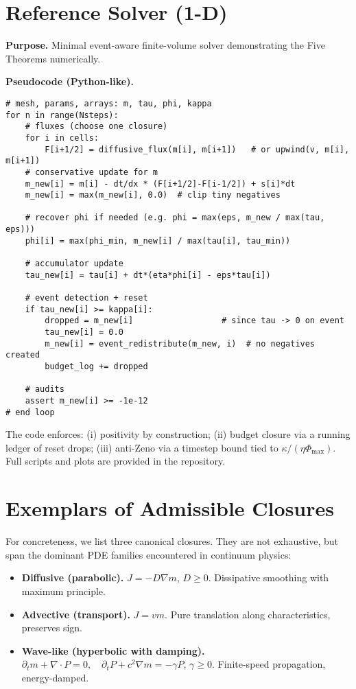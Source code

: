 \documentclass[11pt]{article}
\begin{document}
\appendix
\section{Reference Solver (1-D) }\label{app:solver}

\noindent\textbf{Purpose.}
Minimal event-aware finite-volume solver demonstrating the Five Theorems numerically.

\medskip
\noindent\textbf{Pseudocode (Python-like).}
\begin{verbatim}
# mesh, params, arrays: m, tau, phi, kappa
for n in range(Nsteps):
    # fluxes (choose one closure)
    for i in cells:
        F[i+1/2] = diffusive_flux(m[i], m[i+1])   # or upwind(v, m[i], m[i+1])
    # conservative update for m
    m_new[i] = m[i] - dt/dx * (F[i+1/2]-F[i-1/2]) + s[i]*dt
    m_new[i] = max(m_new[i], 0.0)  # clip tiny negatives

    # recover phi if needed (e.g. phi = max(eps, m_new / max(tau, eps)))
    phi[i] = max(phi_min, m_new[i] / max(tau[i], tau_min))

    # accumulator update
    tau_new[i] = tau[i] + dt*(eta*phi[i] - eps*tau[i])

    # event detection + reset
    if tau_new[i] >= kappa[i]:
        dropped = m_new[i]                  # since tau -> 0 on event
        tau_new[i] = 0.0
        m_new[i] = event_redistribute(m_new, i)  # no negatives created
        budget_log += dropped

    # audits
    assert m_new[i] >= -1e-12
# end loop
\end{verbatim}

\noindent The code enforces: (i) positivity by construction; (ii) budget closure via
a running ledger of reset drops; (iii) anti-Zeno via a timestep bound tied to
$\kappa/(\eta \Phi_{\max})$. Full scripts and plots are provided in the repository.

\section{Exemplars of Admissible Closures}

For concreteness, we list three canonical closures. 
They are not exhaustive, but span the dominant PDE families 
encountered in continuum physics:

\begin{itemize}
  \item \textbf{Diffusive (parabolic).} 
  $J = -D \nabla m$, $D \ge 0$. 
  Dissipative smoothing with maximum principle.

  \item \textbf{Advective (transport).} 
  $J = v m$. 
  Pure translation along characteristics, preserves sign.

  \item \textbf{Wave-like (hyperbolic with damping).} 
  $\partial_t m + \nabla \!\cdot P = 0,\quad 
   \partial_t P + c^2 \nabla m = -\gamma P$, $\gamma \ge 0$. 
  Finite-speed propagation, energy-damped.
\end{itemize}
\end{document}
